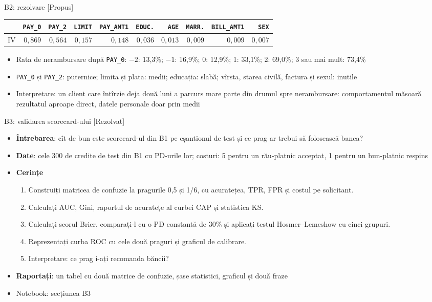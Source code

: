 \ifsolutions
\begin{frame}{B2: rezolvare [Propus]}
\itemsize{\footnotesize}
\begin{center}
\scriptsize
\begin{tabular}{lrrrrrrrrr}
\toprule
& \texttt{PAY\_0} & \texttt{PAY\_2} & \texttt{LIMIT} & \texttt{PAY\_AMT1} & \texttt{EDUC.} & \texttt{AGE} & \texttt{MARR.} & \texttt{BILL\_AMT1} & \texttt{SEX} \\
\midrule
IV & $0{,}869$ & $0{,}564$ & $0{,}157$ & $0{,}148$ & $0{,}036$ & $0{,}013$ & $0{,}009$ & $0{,}009$ & $0{,}007$ \\
\bottomrule
\end{tabular}
\end{center}
\begin{itemize}
    \item Rata de nerambursare după \texttt{PAY\_0}: $-2$: 13{,}3\%; $-1$: 16{,}9\%; 0: 12{,}9\%; 1: 33{,}1\%; 2: 69{,}0\%; 3 sau mai mult: 73{,}4\%
    \item \texttt{PAY\_0} și \texttt{PAY\_2}: puternice; limita și plata: medii; educația: slabă; vîrsta, starea civilă, factura și sexul: inutile
    \item Interpretare: un client care întîrzie deja două luni a parcurs mare parte din drumul spre nerambursare: comportamentul măsoară rezultatul aproape direct, datele personale doar prin medii
\end{itemize}
\end{frame}
\fi

\begin{frame}{B3: validarea scorecard-ului [Rezolvat]}
\itemsize{\footnotesize}
\begin{itemize}
\item \textbf{Întrebarea}: cît de bun este scorecard-ul din B1 pe eșantionul de test și ce prag ar trebui să folosească banca?
\item \textbf{Date}: cele 300 de credite de test din B1 cu PD-urile lor; costuri: 5 pentru un rău-platnic acceptat, 1 pentru un bun-platnic respins
\item \textbf{Cerințe}
\begin{enumerate}
    \item Construiți matricea de confuzie la pragurile 0,5 și 1/6, cu acuratețea, TPR, FPR și costul pe solicitant.
    \item Calculați AUC, Gini, raportul de acuratețe al curbei CAP și statistica KS.
    \item Calculați scorul Brier, comparați-l cu o PD constantă de 30\% și aplicați testul Hosmer--Lemeshow cu cinci grupuri.
    \item Reprezentați curba ROC cu cele două praguri și graficul de calibrare.
    \item Interpretare: ce prag i-ați recomanda băncii?
\end{enumerate}
\item \textbf{Raportați}: un tabel cu două matrice de confuzie, șase statistici, graficul și două fraze
\item Notebook: secțiunea B3
\end{itemize}
\end{frame}

